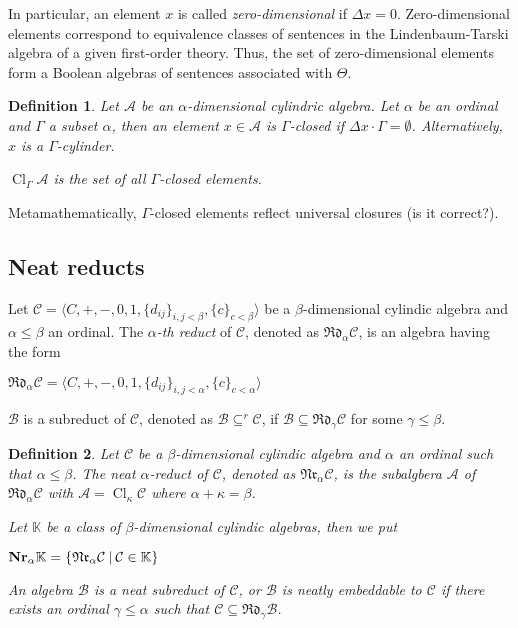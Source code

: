 \documentclass[a4paper]{article}
\theoremstyle{defin}
\newtheorem{defin}{Definition}
\theoremstyle{theorem}
\theoremstyle{prop}
\theoremstyle{lemma}
\theoremstyle{fact}
\theoremstyle{ex}
\theoremstyle{col}
\begin{document}
In particular, an element $x$ is called \emph{zero-dimensional} if $\Delta x = 0$. Zero-dimensional elements correspond to equivalence classes of sentences in the Lindenbaum-Tarski algebra of a given first-order theory. Thus, the set of zero-dimensional elements form a Boolean algebras of sentences associated with $\Theta$.

\begin{defin}
  Let $\mathcal{A}$ be an $\alpha$-dimensional cylindric algebra. Let $\alpha$ be an ordinal and $\Gamma$ a subset $\alpha$, then an element $x \in \mathcal{A}$ is $\Gamma$-closed if $\Delta x \cdot \Gamma = \emptyset$. Alternatively, $x$ is a $\Gamma$-cylinder.

 $\operatorname{Cl}_{\Gamma}\mathcal{A}$ is the set of all $\Gamma$-closed elements.
\end{defin}

Metamathematically, $\Gamma$-closed elements reflect universal closures (is it correct?).

\subsection{Neat reducts}

Let $\mathcal{C} = \langle C, +, -, 0, 1, \{d_{ij}\}_{i, j < \beta}, \{ c \}_{c < \beta} \rangle$ be a $\beta$-dimensional cylindic algebra and $\alpha \leq \beta$ an ordinal. The \emph{$\alpha$-th reduct} of $\mathcal{C}$, denoted as $\mathfrak{R}\mathfrak{d}_{\alpha}\mathcal{C}$, is an algebra having the form
\begin{center}
$\mathfrak{R}\mathfrak{d}_{\alpha}\mathcal{C} = \langle C, +, -, 0, 1, \{d_{ij}\}_{i, j < \alpha}, \{ c \}_{c < \alpha} \rangle$
\end{center}

$\mathcal{B}$ is a subreduct of $\mathcal{C}$, denoted as $\mathcal{B} \subseteq^{r} \mathcal{C}$, if $\mathcal{B} \subseteq \mathfrak{R}\mathfrak{d}_{\gamma}\mathcal{C}$ for some $\gamma \leq \beta$.

\begin{defin}
  Let $\mathcal{C}$ be a $\beta$-dimensional cylindic algebra and $\alpha$ an ordinal such that $\alpha \leq \beta$.
  The neat $\alpha$-reduct of $\mathcal{C}$, denoted as $\mathfrak{N}\mathfrak{r}_\alpha \mathcal{C}$,
  is the subalgbera $\mathcal{A}$ of $\mathfrak{R}\mathfrak{d}_{\alpha}\mathcal{C}$ with $\mathcal{A} = \operatorname{Cl}_{\kappa} \mathcal{C}$ where $\alpha + \kappa = \beta$.

  Let $\mathbb{K}$ be a class of $\beta$-dimensional cylindic algebras, then we put
  \begin{center}
    ${\bf Nr}_{\alpha}\mathbb{K} = \{ \mathfrak{N}\mathfrak{r}_\alpha \mathcal{C} \: | \: \mathcal{C} \in \mathbb{K} \}$
  \end{center}

  An algebra $\mathcal{B}$ is a neat subreduct of $\mathcal{C}$, or $\mathcal{B}$ is neatly embeddable to $\mathcal{C}$ if there exists an ordinal $\gamma \leq \alpha$ such that
  $\mathcal{C} \subseteq \mathfrak{R}\mathfrak{d}_{\gamma}\mathcal{B}$.
\end{defin}
\end{document}
